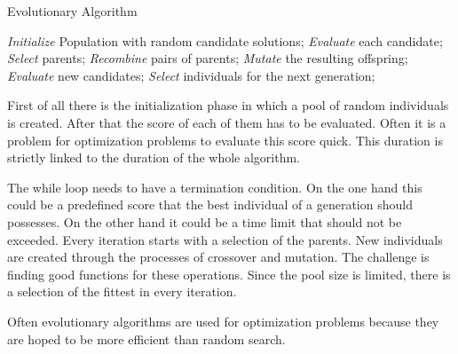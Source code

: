 \begin{algorithm}
\caption{Evolutionary Algorithm~\cite{evo}}
\label{alg:evo}
\begin{algorithmic}
\State \emph{Initialize} Population with random candidate solutions;
\State \emph{Evaluate} each candidate;
\State \emph{Select} parents;
\State \emph{Recombine} pairs of parents;
\State \emph{Mutate} the resulting offspring;
\State \emph{Evaluate} new candidates;
\State \emph{Select} individuals for the next generation;
\EndWhile
\end{algorithmic}
\end{algorithm}

First of all there is the initialization phase in which a pool of random individuals is created. After that the score of each of them has to be evaluated. Often it is a problem for optimization problems to evaluate this score quick. This duration is
strictly linked to the duration of the whole algorithm.

The while loop needs to have a termination condition. On the one hand this could be
a predefined score that the best individual of a generation should possesses. On the other 
hand it could be a time limit that should not be exceeded.
Every iteration starts with a selection of the parents.
New individuals are created through the processes of crossover and mutation.
The challenge is finding good functions for these operations. 
Since the pool size is limited, there is a selection of the fittest in every iteration.

Often evolutionary algorithms are used for optimization problems because they are hoped to be more efficient than random search.

